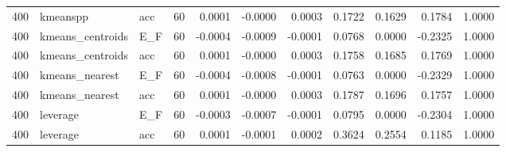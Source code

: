 \begin{table}
\begin{tabular}{rllrrrrrrrr}
400 & kmeanspp & acc & 60 & 0.0001 & -0.0000 & 0.0003 & 0.1722 & 0.1629 & 0.1784 & 1.0000 \\
400 & kmeans\_centroids & E\_F & 60 & -0.0004 & -0.0009 & -0.0001 & 0.0768 & 0.0000 & -0.2325 & 1.0000 \\
400 & kmeans\_centroids & acc & 60 & 0.0001 & -0.0000 & 0.0003 & 0.1758 & 0.1685 & 0.1769 & 1.0000 \\
400 & kmeans\_nearest & E\_F & 60 & -0.0004 & -0.0008 & -0.0001 & 0.0763 & 0.0000 & -0.2329 & 1.0000 \\
400 & kmeans\_nearest & acc & 60 & 0.0001 & -0.0000 & 0.0003 & 0.1787 & 0.1696 & 0.1757 & 1.0000 \\
400 & leverage & E\_F & 60 & -0.0003 & -0.0007 & -0.0001 & 0.0795 & 0.0000 & -0.2304 & 1.0000 \\
400 & leverage & acc & 60 & 0.0001 & -0.0001 & 0.0002 & 0.3624 & 0.2554 & 0.1185 & 1.0000 \\
\bottomrule
\end{tabular}
\end{table}
